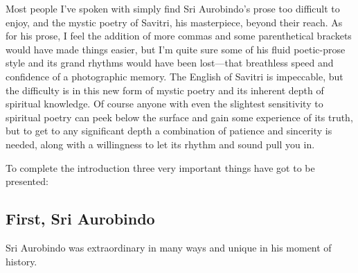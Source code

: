 \documentclass[12pt,a4paper]{book}
\begin{document}
Most people I've spoken with simply find Sri Aurobindo's prose too
difficult to enjoy, and the mystic poetry of Savitri, his masterpiece,
beyond their reach. As for his prose, I feel the addition of more
commas and some parenthetical brackets would have made things easier,
but I'm quite sure some of his fluid poetic-prose style and its grand
rhythms would have been lost---that breathless speed and confidence of
a photographic memory. The English of Savitri is impeccable, but the
difficulty is in this new form of mystic poetry and its inherent depth
of spiritual knowledge. Of course anyone with even the slightest
sensitivity to spiritual poetry can peek below the surface and gain
some experience of its truth, but to get to any significant depth a
combination of patience and sincerity is needed, along with a
willingness to let its rhythm and sound pull you in.

To complete the introduction three very important things have got to
be presented:

\subsection*{First, Sri Aurobindo}

Sri Aurobindo was extraordinary in many ways and unique in his moment
of history.
\end{document}
